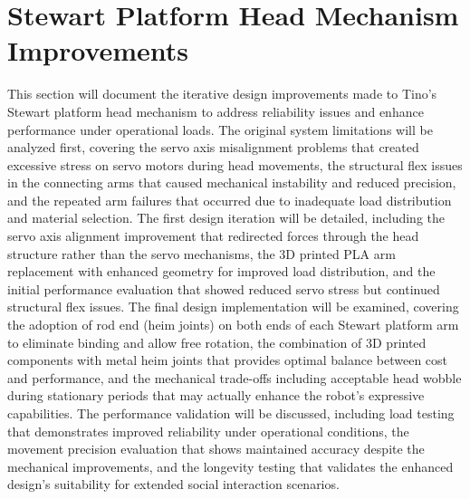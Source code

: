 \section{Stewart Platform Head Mechanism Improvements}
This section will document the iterative design improvements made to Tino's Stewart platform head mechanism to address reliability issues and enhance performance under operational loads. The original system limitations will be analyzed first, covering the servo axis misalignment problems that created excessive stress on servo motors during head movements, the structural flex issues in the connecting arms that caused mechanical instability and reduced precision, and the repeated arm failures that occurred due to inadequate load distribution and material selection. The first design iteration will be detailed, including the servo axis alignment improvement that redirected forces through the head structure rather than the servo mechanisms, the 3D printed PLA arm replacement with enhanced geometry for improved load distribution, and the initial performance evaluation that showed reduced servo stress but continued structural flex issues. The final design implementation will be examined, covering the adoption of rod end (heim joints) on both ends of each Stewart platform arm to eliminate binding and allow free rotation, the combination of 3D printed components with metal heim joints that provides optimal balance between cost and performance, and the mechanical trade-offs including acceptable head wobble during stationary periods that may actually enhance the robot's expressive capabilities. The performance validation will be discussed, including load testing that demonstrates improved reliability under operational conditions, the movement precision evaluation that shows maintained accuracy despite the mechanical improvements, and the longevity testing that validates the enhanced design's suitability for extended social interaction scenarios.

